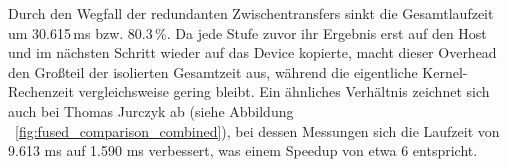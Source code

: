 Durch den Wegfall der redundanten Zwischentransfers sinkt die Gesamtlaufzeit
um 30.615\,ms bzw. 80.3\,\%. Da jede Stufe zuvor ihr Ergebnis erst auf den
Host und im nächsten Schritt wieder auf das Device kopierte, macht dieser
Overhead den Großteil der isolierten Gesamtzeit aus, während die eigentliche
Kernel-Rechenzeit vergleichsweise gering bleibt. Ein ähnliches Verhältnis zeichnet sich auch bei Thomas Jurczyk ab (siehe Abbildung ~\ref{fig:fused_comparison_combined}), bei dessen Messungen sich die Laufzeit von 9.613 ms auf 1.590 ms verbessert, was einem Speedup von etwa 6 entspricht.
